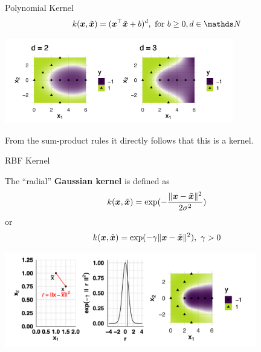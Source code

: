 \begin{vbframe}{Polynomial Kernel}
  $$k(\xv, \tilde \xv) = (\xv^\top \tilde \xv + b)^d, \text{ for } b\geq 0, d \in \N$$

\begin{center}
\includegraphics[width = 10cm ]{figure_man/polynom_kernel0.png}
\end{center}

From the sum-product rules it directly follows that this is a kernel.
\end{vbframe}

\begin{vbframe}{RBF Kernel}

The \enquote{radial} \textbf{Gaussian kernel} is defined as
$$k(\bm{x}, \tilde {\bm{x}}) = \exp(-\frac{\|\bm{x} - \tilde {\bm{x}}\|^2}{2\sigma^2})$$ 
or 
$$k(\bm{x}, \tilde {\bm{x}}) = \exp(-\gamma \|\bm{x} - \tilde {\bm{x}}\|^2), ~ \gamma>0$$

\begin{center}
\includegraphics[width = 11cm ]{figure_man/rbf_kernel0.png}
\end{center}
\end{vbframe}


